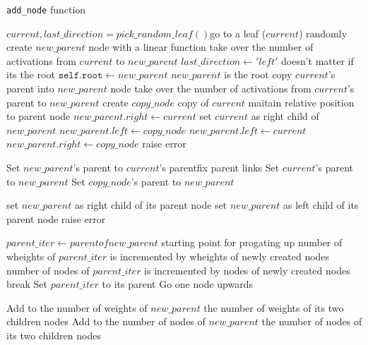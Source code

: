 \begin{algorithm}[!ht]
\caption{\texttt{add\_node} function}
\label{algo:pseudo_add_node_function}
\begin{algorithmic}
\State $current, last\_direction = pick\_random\_leaf()$\Comment go to a leaf ($current$) randomly
    \State create $new\_parent$ node with a linear function
    \State take over the number of activations from $current$ to $new\_parent$
    \State $last\_direction \gets 'left'$ \Comment doesn't matter if its the root
    \State $\texttt{self.root} \gets new\_parent$ \Comment $new\_parent$ is the root
\Else
    \State copy $current$'s parent into $new\_parent$ node
    \State take over the number of activations from $current$'s parent to $new\_parent$
\EndIf
\State create $copy\_node$ \Comment copy of $current$
\Comment maitain relative position to parent node
    \State $new\_parent.right \gets current$ \Comment set $current$ as right child of $new\_parent$
    \State $new\_parent.left \gets copy\_node$
    \State $new\_parent.left \gets current$
    \State $new\_parent.right \gets copy\_node$
\Else
    \State raise error
\EndIf

\State Set $new\_parent$'s parent to $current$'s parent\Comment fix parent links
\State Set $current$'s parent to $new\_parent$
\State Set $copy\_node$'s parent to $new\_parent$

        \State set $new\_parent$ as right child of its parent node
        \State set $new\_parent$ as left child of its parent node
    \Else
        \State raise error
    \EndIf
\EndIf

    \State $parent\_iter \gets parent of new\_parent$ \Comment starting point for progating up
        \State number of wheights of $parent\_iter$ is incremented by wheights of newly created nodes
        \State number of nodes of $parent\_iter$ is incremented by nodes of newly created nodes
            \State break
        \Else
            \State Set $parent\_iter$ to its parent \Comment Go one node upwards
        \EndIf

    \EndWhile
\EndIf

\State Add to the number of weights of $new\_parent$ the number of weights of its two children nodes
\State Add to the number of nodes of $new\_parent$ the number of nodes of its two children nodes

\EndFunction
\end{algorithmic}
\end{algorithm}


